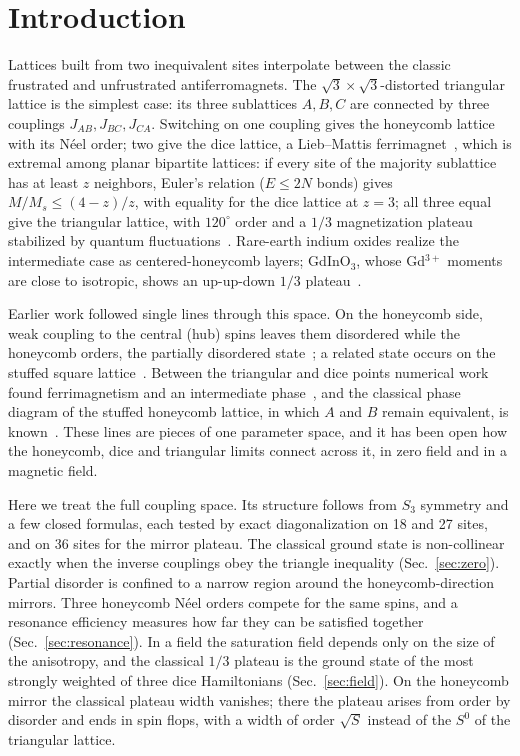 \documentclass[prb,twocolumn,superscriptaddress,amsmath,amssymb,floatfix]{revtex4-2}
\begin{document}
\section{Introduction}
Lattices built from two inequivalent sites interpolate between the classic frustrated and unfrustrated antiferromagnets. The $\sqrt3\times\sqrt3$-distorted triangular lattice is the simplest case: its three sublattices $A,B,C$ are connected by three couplings $J_{AB},J_{BC},J_{CA}$. Switching on one coupling gives the honeycomb lattice with its N\'eel order; two give the dice lattice, a Lieb--Mattis ferrimagnet~\cite{LiebMattis1962}, which is extremal among planar bipartite lattices: if every site of the majority sublattice has at least $z$ neighbors, Euler's relation ($E\le2N$ bonds) gives $M/M_s\le(4-z)/z$, with equality for the dice lattice at $z=3$; all three equal give the triangular lattice, with $120^\circ$ order and a $1/3$ magnetization plateau stabilized by quantum fluctuations~\cite{ChubukovGolosov1991}. Rare-earth indium oxides realize the intermediate case as centered-honeycomb layers; GdInO$_3$, whose Gd$^{3+}$ moments are close to isotropic, shows an up-up-down $1/3$ plateau~\cite{Yuan2023}.

Earlier work followed single lines through this space. On the honeycomb side, weak coupling to the central (hub) spins leaves them disordered while the honeycomb orders, the partially disordered state~\cite{Gonzalez2019,SeifertVojta2019}; a related state occurs on the stuffed square lattice~\cite{Blesio2023}. Between the triangular and dice points numerical work found ferrimagnetism and an intermediate phase~\cite{NakanoSakai2017,NakanoSakai2018,Shimada2018,Shimada2018b}, and the classical phase diagram of the stuffed honeycomb lattice, in which $A$ and $B$ remain equivalent, is known~\cite{Sahoo2018}. These lines are pieces of one parameter space, and it has been open how the honeycomb, dice and triangular limits connect across it, in zero field and in a magnetic field.

Here we treat the full coupling space. Its structure follows from $S_3$ symmetry and a few closed formulas, each tested by exact diagonalization on 18 and 27 sites, and on 36 sites for the mirror plateau. The classical ground state is non-collinear exactly when the inverse couplings obey the triangle inequality (Sec.~\ref{sec:zero}). Partial disorder is confined to a narrow region around the honeycomb-direction mirrors. Three honeycomb N\'eel orders compete for the same spins, and a resonance efficiency measures how far they can be satisfied together (Sec.~\ref{sec:resonance}). In a field the saturation field depends only on the size of the anisotropy, and the classical $1/3$ plateau is the ground state of the most strongly weighted of three dice Hamiltonians (Sec.~\ref{sec:field}). On the honeycomb mirror the classical plateau width vanishes; there the plateau arises from order by disorder and ends in spin flops, with a width of order $\sqrt S$ instead of the $S^0$ of the triangular lattice.
\end{document}
